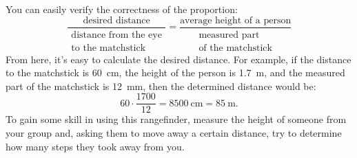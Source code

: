 You can easily verify the correctness of the proportion:
\begin{equation*}%
\frac{\text{desired distance}}{\begin{array}{c}\text{distance from the eye}\\ \text{to the matchstick}\end{array}} = \frac{\text{average height of a person}}{\begin{array}{c}\text{measured part}\\ \text{of the matchstick}\end{array}}
\end{equation*}
From here, it's easy to calculate the desired distance. For example, if the distance to the matchstick is \SI{60}{\centi\meter}, the height of the person is \SI{1.7}{\meter}, and the measured part of the matchstick is \SI{12}{\milli\meter}, then the determined distance would be:
\begin{equation*}%
60 \cdot \frac{1700}{12} = \SI{8500}{\centi\meter} = \SI{85}{\meter}.
\end{equation*}
To gain some skill in using this rangefinder, measure the height of someone from your group and, asking them to move away a certain distance, try to determine how many steps they took away from you.

